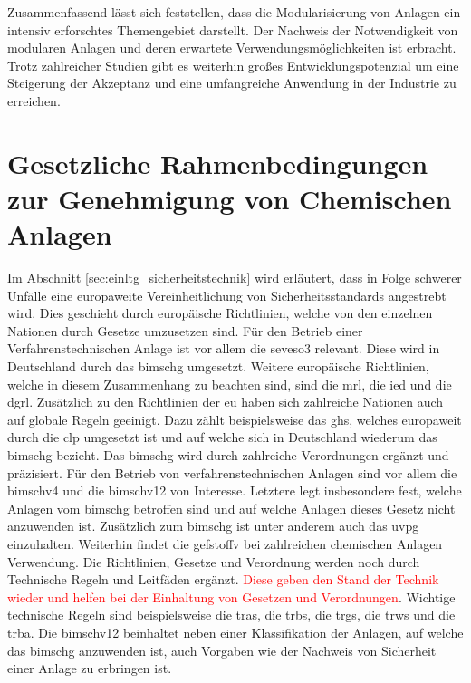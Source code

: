Zusammenfassend l\"asst sich feststellen, dass die Modularisierung von Anlagen ein intensiv erforschtes Themengebiet darstellt. Der Nachweis der Notwendigkeit von modularen Anlagen und deren erwartete Verwendungsm\"oglichkeiten ist erbracht. Trotz zahlreicher Studien gibt es weiterhin gro\ss{}es Entwicklungspotenzial um eine Steigerung der Akzeptanz und eine  umfangreiche Anwendung in der Industrie zu erreichen.  


\section{Gesetzliche Rahmenbedingungen zur Genehmigung von Chemischen Anlagen}
Im Abschnitt \ref{sec:einltg_sicherheitstechnik} wird erl\"autert, dass in Folge schwerer Unf\"alle eine europaweite Vereinheitlichung von Sicherheitsstandards angestrebt wird. Dies geschieht durch europ\"aische Richtlinien, welche von den einzelnen Nationen durch Gesetze umzusetzen sind. F\"ur den Betrieb einer Verfahrenstechnischen Anlage ist vor allem die \ac{seveso3} relevant. Diese wird in Deutschland durch das \ac{bimschg} umgesetzt. Weitere europ\"aische Richtlinien, welche in diesem Zusammenhang zu beachten sind, sind die \ac{mrl}, die \ac{ied} und die \ac{dgrl}. Zus\"atzlich zu den Richtlinien der \ac{eu} haben sich zahlreiche Nationen auch auf globale Regeln geeinigt. Dazu z\"ahlt beispielsweise das \ac{ghs}, welches europaweit durch die \ac{clp} umgesetzt ist und auf welche sich in Deutschland wiederum das \ac{bimschg} bezieht. \newline
Das \ac{bimschg} wird durch zahlreiche Verordnungen erg\"anzt und pr\"azisiert. F\"ur den Betrieb von verfahrenstechnischen Anlagen sind vor allem die \ac{bimschv4} und die \ac{bimschv12} von Interesse. Letztere legt insbesondere fest, welche Anlagen vom \ac{bimschg} betroffen sind und auf welche Anlagen dieses Gesetz nicht anzuwenden ist. \newline
Zus\"atzlich zum \ac{bimschg} ist unter anderem auch das \ac{uvpg} einzuhalten. Weiterhin findet die \ac{gefstoffv} bei zahlreichen chemischen Anlagen Verwendung. \newline
Die Richtlinien, Gesetze und Verordnung werden noch durch Technische Regeln und Leitf\"aden erg\"anzt. \textcolor{red}{Diese geben den Stand der Technik wieder und helfen bei der Einhaltung von Gesetzen und Verordnungen}. Wichtige technische Regeln sind beispielsweise die \ac{tras}, die \ac{trbs}, die \ac{trgs}, die \ac{trws} und die \ac{trba}. \newline
Die \ac{bimschv12} beinhaltet neben einer Klassifikation der Anlagen, auf welche das \ac{bimschg} anzuwenden ist, auch Vorgaben wie der Nachweis von Sicherheit einer Anlage zu erbringen ist. 

